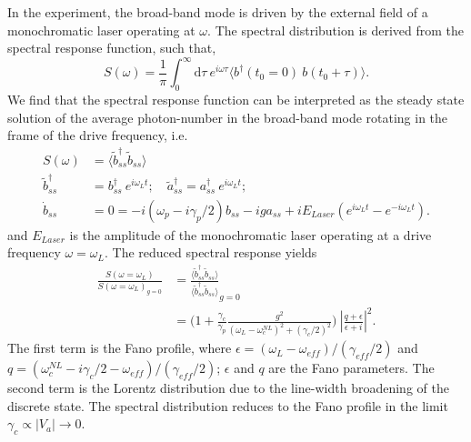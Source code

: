 \documentclass[12pt]{article}
\begin{document}
In the experiment, the broad-band mode is driven by the external
field of a monochromatic laser operating at $\omega$. The spectral 
distribution is derived from the spectral response function, such that,
\begin{equation}
S(\omega) = \frac{1}{\pi} \int_0^{\infty} \mathrm{d}\tau \: 
    e^{i \omega \tau} 
    \langle b^{\dagger}(t_0=0) \: b(t_0 + \tau) \rangle.
\end{equation}
We find that the spectral response function can be interpreted as the steady 
state solution of the average photon-number in the broad-band mode rotating 
in the frame of the drive frequency, i.e.
\begin{align}
S(\omega) &= \langle \tilde{b}^{\dagger}_{ss}\tilde{b}_{ss} \rangle
\\
\tilde{b}^{\dagger}_{ss} &= 
    b^{\dagger}_{ss} \: e^{i \omega_L t}; \quad
    \tilde{a}^{\dagger}_{ss} =
    a^{\dagger}_{ss} \: e^{i \omega_L t};
\\
\dot{b}_{ss} &= 0 =
    -i ( \omega_p - i\gamma_p/2 ) b_{ss} - ig a_{ss}
    + iE_{Laser}( e^{i \omega_L t} - e^{-i \omega_L t} ).
\end{align}
and $E_{Laser}$ is the amplitude of the monochromatic laser operating at
a drive frequency $\omega = \omega_L$. The reduced spectral response yields
\begin{equation}
\begin{split}
\frac{ S(\omega = \omega_L) }{ S(\omega = \omega_L)_{g=0} } &= 
    \frac{\langle \tilde{b}^{\dagger}_{ss}\tilde{b}_{ss} \rangle}
        {\langle \tilde{b}^{\dagger}_{ss}\tilde{b}_{ss} \rangle}_{g=0}
\\
&= \Bigg( 1 +
    \frac{\gamma_c}{\gamma_p}
    \frac{g^2}{(\omega_L - \omega_c^{NL})^2 + (\gamma_c/2)^2}
    \Bigg) \:
    \left\vert \frac{q + \epsilon}{\epsilon + i} \right\vert^2.
\end{split}
\end{equation}
The first term is the Fano profile, where 
$\epsilon=(\omega_L - \omega_{eff})/(\gamma_{eff}/2)$ and 
$q = (\omega_c^{NL} - i\gamma_c/2 - \omega_{eff})/(\gamma_{eff}/2)$;
$\epsilon$ and $q$ are the Fano parameters. The second
term is the Lorentz distribution due to the line-width broadening of the
discrete state. The spectral distribution reduces to the Fano profile in the
limit $\gamma_c \propto |V_a| \rightarrow 0$.
\end{document}
